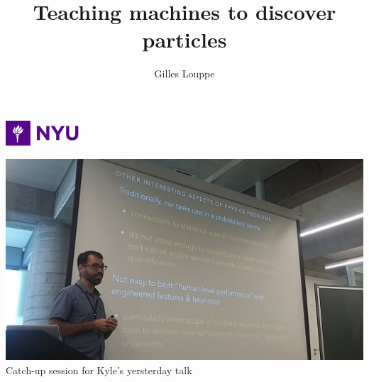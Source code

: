 \documentclass{beamer}
\title{{\bf Teaching machines to discover particles}}
\author{{Gilles Louppe}}
\date{}
\begin{document}
\begin{frame}[plain]
\titlepage
\centering
\includegraphics[height=2.5em]{figures/nyu.jpg}
\end{frame}




\begin{frame}
    \begin{center}
        \includegraphics[width=\textwidth]{figures/catchup.jpg}\\
        Catch-up session for Kyle's yersterday talk
    \end{center}
\end{frame}

\begin{frame}
\end{frame}
\end{document}

